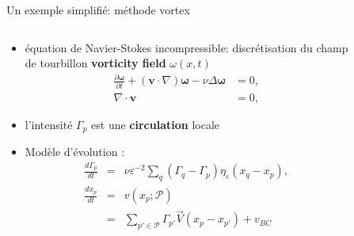 \documentclass[aspectratio=169]{beamer} %
\begin{document}
\begin{frame}{Un exemple simplifié: méthode vortex~\footnotemark[1]}
    \small
    \vspace{-0.5cm}
    \begin{columns}[t]
        \begin{column}{0.5\textwidth}
            \begin{itemize}
                \item équation de Navier-Stokes incompressible: discrétisation du champ de tourbillon \textbf{vorticity field} $\omega(x, t)$ \\
                      \begin{eqnarray*}
                          \frac{\partial \bm \omega}{\partial t} + (\bm{v} \cdot \nabla) \bm \omega - \nu \Delta \bm \omega & = 0, \\
                          \nabla \cdot \bm v                                                                                & = 0,
                      \end{eqnarray*}
                \item l'intensité $\Gamma_p$ est une \textbf{circulation} locale
                \item Modèle d'évolution : \\
                      \begin{eqnarray*}
                          \frac{d\Gamma_p}{dt} &=& \nu \varepsilon^{-2} \sum_q (\Gamma_q - \Gamma_p) \eta_\varepsilon(x_q - x_p), \\
                          \frac{d x_p}{d t} &=& v(x_p; \mathcal P) \\
                          &=& \sum_{p' \in \mathcal P} \Gamma_{p'} \vec{V}(x_p - x_{p'}) + v_{BC} \\
                      \end{eqnarray*}
            \end{itemize}
        \end{column}
        \begin{column}{0.5\textwidth}
            \begin{figure}
            \end{figure}
        \end{column}
    \end{columns}
\end{frame}
\end{document}
